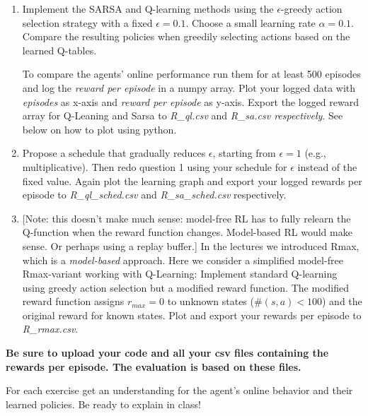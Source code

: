 \begin{enumerate}
\item Implement the SARSA and Q-learning methods using the
  $\epsilon$-greedy action selection strategy with a fixed $\epsilon=
  0.1$. Choose a small learning rate $\alpha = 0.1$. Compare the
  resulting policies when greedily selecting actions based on the
  learned Q-tables.
        
  To compare the agents' online performance run them for at
  least 500 episodes and log the \textit{reward per episode} in a
  numpy array. Plot your logged data with
  \textit{episodes} as x-axis and \textit{reward per episode} as
  y-axis. Export the logged reward array for Q-Leaning and Sarsa to
  \textit{R\_ql.csv} and \textit{R\_sa.csv respectively}. See below on
  how to plot using python.
    
\item Propose a schedule that gradually reduces $\epsilon$, starting
  from $\epsilon = 1$ (e.g., multiplicative).  Then redo question 1
  using your schedule for $\epsilon$ instead of the fixed value. Again
  plot the learning graph and export your logged rewards per episode
  to \textit{R\_ql\_sched.csv} and \textit{R\_sa\_sched.csv}
  respectively.

\item {} [Note: this doesn't make much sense: model-free RL has to fully relearn the Q-function when the reward function changes. Model-based RL would make sense. Or perhaps using a replay buffer.] In the lectures we introduced Rmax, which is a
  \emph{model-based} approach. Here we consider a simplified
  model-free Rmax-variant working with Q-Learning: Implement standard
  Q-learning using greedy action selection but a modified reward
  function. The modified reward function assigns $r_{max} = 0$ to
  unknown states ($\#(s,a)<100$) and the original reward for known
  states. Plot and export your rewards per episode
  to \textit{R\_rmax.csv}.
\end{enumerate}

{\bf
Be sure to upload your code and all your csv files containing the
rewards per episode. The evaluation is based on these files.

For each exercise get an understanding for the agent's online
behavior and their learned policies. Be ready to explain in class!

}


